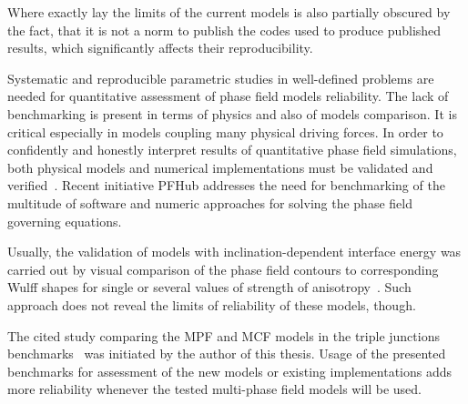 Where exactly lay the limits of the current models is also partially obscured by the fact, that it is not a norm to publish the codes used to produce published results, which significantly affects their reproducibility. 

Systematic and reproducible parametric studies in well-defined problems are needed for quantitative assessment of phase field models reliability. The lack of benchmarking is present in terms of physics and also of models comparison. It is critical especially in models coupling many physical driving forces. In order to confidently and honestly interpret results of quantitative phase field simulations, both physical models and numerical implementations must be validated and verified~\cite{Jokisaari2017}. Recent initiative PFHub addresses the need for benchmarking of the multitude of software and numeric approaches for solving the phase field governing equations. 

Usually, the validation of models with inclination-dependent interface energy was carried out by visual comparison of the phase field contours to corresponding Wulff shapes for single or several values of strength of anisotropy~\cite{Garcke1999,Eggleston2001,Fleck2011,Ma2006,Tschukin2017}. Such approach does not reveal the limits of reliability of these models, though.

The cited study comparing the MPF and MCF models in the triple junctions benchmarks~\cite{Daubner2023} was initiated by the author of this thesis. Usage of the presented benchmarks for assessment of the new models or existing implementations adds more reliability whenever the tested multi-phase field models will be used.

\cleardoublepage


